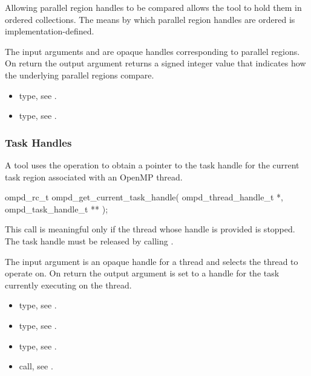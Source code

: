 Allowing parallel region handles to be compared allows the tool to hold them in ordered
collections. The means by which parallel region handles are ordered is implementation-defined.

\argdesc

The input arguments  and  are opaque handles
corresponding to parallel regions.
On return the output argument   returns a signed
integer value that indicates how the underlying parallel regions compare.

\crossreferences
\begin{itemize}
  \item {} type, see .
	\item {} type, see .
\end{itemize}

\subsubsection{Task Handles}

\label{subsubsubsec:ompd_get_current_task_handle}
\summary
A tool uses the  operation to obtain a pointer to the
task handle for the current task region associated with an OpenMP thread.

\format

\begin{cspecific}
\begin{ompSyntax}
ompd_rc_t ompd_get_current_task_handle(
  ompd_thread_handle_t *,
  ompd_task_handle_t **
);
\end{ompSyntax}
\end{cspecific}


\descr
This call is meaningful only if the thread whose handle is provided is stopped.
The task handle must be released by calling .

\argdesc
The input argument  is an opaque handle for a thread and selects the thread to operate on.
On return the output argument  is set to a handle for the task
currently executing on the thread.

\crossreferences
\begin{itemize}
  \item {} type, see .
	\item {} type, see .
	\item {} type, see .
	\item {} call, see .
\end{itemize}

